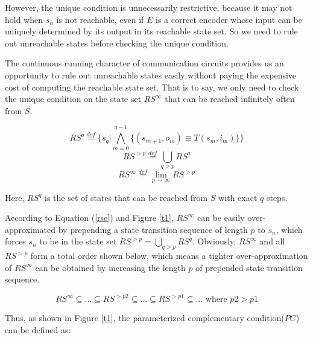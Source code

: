 \documentclass[journal]{IEEEtran}
\begin{document}
However,
the unique condition is unnecessarily restrictive,
because it may not hold when $s_n$ is not reachable,
even if $E$ is a correct encoder whose input can be uniquely determined by its output in its reachable state set.
So we need to rule out unreachable states before checking the unique condition.

The continuous running character of communication circuits provides us an opportunity to rule out unreachable states easily without paying the expensive cost of computing the reachable state set.
That is to say,
we only need to check the unique condition on the state set $RS^{\infty}$ that can be reached infinitely often from $S$.

\begin{equation}
RS^{q}\overset{def}{=} \{s_q|\bigwedge_{m=0}^{q-1}\{(s_{m+1},o_m)\equiv T(s_m,i_m)\}\}
\end{equation}
\begin{equation}
RS^{>p}\overset{def}{=}\bigcup_{q>p} RS^{q}
\end{equation}
\begin{equation}\label{rse}
RS^{\infty}\overset{def}{=}\lim_{p\rightarrow\infty}RS^{>p}
\end{equation}

Here,
$RS^{q}$ is the set of states that can be reached from $S$ with exact $q$ steps.

According to Equation (\ref{rse}) and Figure \ref{t1},
$RS^{\infty}$ can be easily over-approximated by prepending a state transition sequence of length $p$ to $s_{n}$,
which forces $s_{n}$ to be in the state set $RS^{>p}=\bigcup_{q>p} RS^{q}$.
Obviously,
$RS^{\infty}$ and all $RS^{>p}$ form a total order shown below,
which means a tighter over-approximation of $RS^{\infty}$ can be obtained by increasing the length $p$ of prepended state transition sequence.

\begin{displaymath}
RS^{\infty}\subseteq\dots \subseteq RS^{>p2}\subseteq\dots \subseteq RS^{> p1}\subseteq\dots \textrm{  where } p2>p1
\end{displaymath}

Thus,
as shown in Figure \ref{t1},
the parameterized complementary condition($PC$)\cite{ShengYuShen:iccad09} can be defined as:
\end{document}
